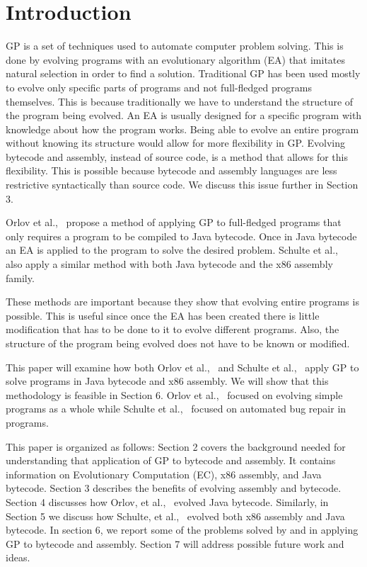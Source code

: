 \documentclass{sig-alternate}
\begin{document}

\section{Introduction}
GP is a set of techniques used to automate computer problem solving. This is done by evolving programs with an evolutionary algorithm (EA) that imitates natural selection in order to find a solution. Traditional GP has been used mostly to evolve only specific parts of programs and not full-fledged programs themselves. This is because traditionally we have to understand the structure of the program being evolved. An EA is usually designed for a specific program with knowledge about how the program works. Being able to evolve an entire program without knowing its structure would allow for more flexibility in GP. Evolving bytecode and assembly, instead of source code, is a method that allows for this flexibility. This is possible because bytecode and assembly languages are less restrictive syntactically than source code. We discuss this issue further in Section 3.\par 

Orlov et al.,~\cite{FINCH2:2009} propose a method of applying GP to full-fledged programs that only requires a program to be compiled to Java bytecode. Once in Java bytecode an EA is applied to the program to solve the desired problem. Schulte et al.,~\cite{Assembly:2010} also apply a similar method with both Java bytecode and the x86 assembly family.

These methods are important because they show that evolving entire programs is possible. This is useful since once the EA has been created there is little modification that has to be done to it to evolve different programs. Also, the structure of the program being evolved does not have to be known or modified.\par

	This paper will examine how both Orlov et al.,~\cite{FINCH:2011} and Schulte et al.,~\cite{Assembly:2010} apply GP to solve programs in Java bytecode and x86 assembly. We will show that this methodology is feasible in Section 6. Orlov et al.,~\cite{FINCH:2011} focused on evolving simple programs as a whole while Schulte et al.,~\cite{Assembly:2010} focused on automated bug repair in programs.\par
	
This paper is organized as follows: Section 2 covers the background needed for understanding that application of GP to bytecode and assembly. It contains information on Evolutionary Computation (EC), x86 assembly, and Java bytecode. Section 3 describes the benefits of evolving assembly and bytecode. Section 4 discusses how Orlov, et al.,~\cite{FINCH:2011} evolved Java bytecode. Similarly, in Section 5 we discuss how Schulte, et al.,~\cite{Assembly:2010} evolved both x86 assembly and Java bytecode. In section 6, we report some of the problems solved by \cite{FINCH:2011} and \cite{Assembly:2010} in applying GP to bytecode and assembly. Section 7 will address possible future work and ideas.  
	
\end{document}

